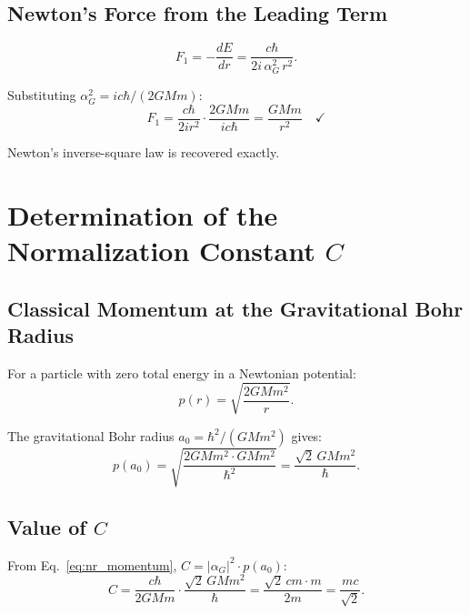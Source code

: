 \documentclass[11pt,a4paper]{article}
\theoremstyle{definition}
\theoremstyle{remark}
\begin{document}
	\subsection{Newton's Force from the Leading Term}
	
	\begin{equation}
		F_1 = -\frac{dE}{dr} = \frac{c\hbar}{2i\,\alpha_G^2\,r^2}.
	\end{equation}
	
	Substituting $\alpha_G^2 = ic\hbar/(2GMm)$:
	\begin{equation}
		F_1 = \frac{c\hbar}{2ir^2}\cdot\frac{2GMm}{ic\hbar} = \frac{GMm}{r^2} \quad\checkmark
	\end{equation}
	
	Newton's inverse-square law is recovered exactly.
	
	\section{Determination of the Normalization Constant $C$}
	
	\subsection{Classical Momentum at the Gravitational Bohr Radius}
	
	For a particle with zero total energy in a Newtonian potential:
	\begin{equation}
		p(r) = \sqrt{\frac{2GMm^2}{r}}.
	\end{equation}
	
	The gravitational Bohr radius $a_0 = \hbar^2/(GMm^2)$ gives:
	\begin{equation}
		p(a_0) = \sqrt{\frac{2GMm^2\cdot GMm^2}{\hbar^2}} = \frac{\sqrt{2}\,GMm^2}{\hbar}.
	\end{equation}
	
	\subsection{Value of $C$}
	
	From Eq.~\eqref{eq:nr_momentum}, $C = |\alpha_G|^2\cdot p(a_0)$:
	\begin{equation}
		C = \frac{c\hbar}{2GMm}\cdot\frac{\sqrt{2}\,GMm^2}{\hbar} = \frac{\sqrt{2}\,cm\cdot m}{2m} = \frac{mc}{\sqrt{2}}.
	\end{equation}
	
\end{document}
